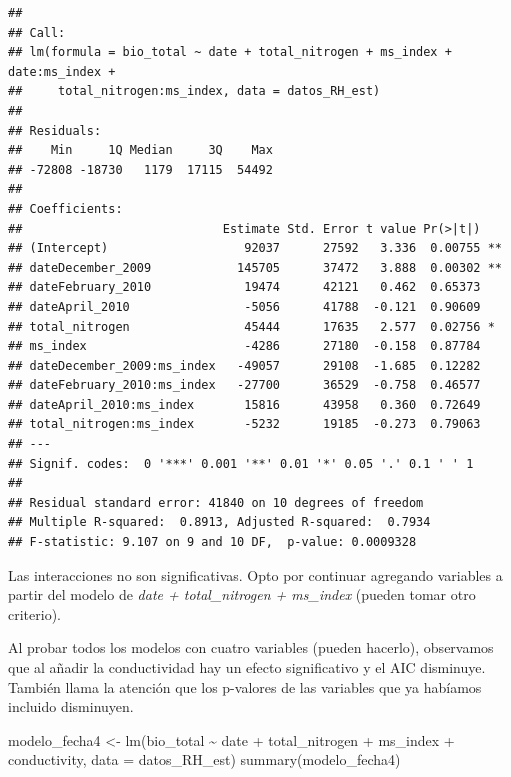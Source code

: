 \documentclass[
]{book}
\newenvironment{Shaded}{\begin{snugshade}}{\end{snugshade}}
\newcommand{\AttributeTok}[1]{\textcolor[rgb]{0.77,0.63,0.00}{#1}}
\newcommand{\FunctionTok}[1]{\textcolor[rgb]{0.00,0.00,0.00}{#1}}
\newcommand{\NormalTok}[1]{#1}
\newcommand{\OtherTok}[1]{\textcolor[rgb]{0.56,0.35,0.01}{#1}}
\newcommand{\SpecialCharTok}[1]{\textcolor[rgb]{0.00,0.00,0.00}{#1}}
\begin{document}
\begin{verbatim}
## 
## Call:
## lm(formula = bio_total ~ date + total_nitrogen + ms_index + date:ms_index + 
##     total_nitrogen:ms_index, data = datos_RH_est)
## 
## Residuals:
##    Min     1Q Median     3Q    Max 
## -72808 -18730   1179  17115  54492 
## 
## Coefficients:
##                            Estimate Std. Error t value Pr(>|t|)   
## (Intercept)                   92037      27592   3.336  0.00755 **
## dateDecember_2009            145705      37472   3.888  0.00302 **
## dateFebruary_2010             19474      42121   0.462  0.65373   
## dateApril_2010                -5056      41788  -0.121  0.90609   
## total_nitrogen                45444      17635   2.577  0.02756 * 
## ms_index                      -4286      27180  -0.158  0.87784   
## dateDecember_2009:ms_index   -49057      29108  -1.685  0.12282   
## dateFebruary_2010:ms_index   -27700      36529  -0.758  0.46577   
## dateApril_2010:ms_index       15816      43958   0.360  0.72649   
## total_nitrogen:ms_index       -5232      19185  -0.273  0.79063   
## ---
## Signif. codes:  0 '***' 0.001 '**' 0.01 '*' 0.05 '.' 0.1 ' ' 1
## 
## Residual standard error: 41840 on 10 degrees of freedom
## Multiple R-squared:  0.8913, Adjusted R-squared:  0.7934 
## F-statistic: 9.107 on 9 and 10 DF,  p-value: 0.0009328
\end{verbatim}

Las interacciones no son significativas. Opto por continuar agregando variables a partir del modelo de \emph{date + total\_nitrogen + ms\_index} (pueden tomar otro criterio).

Al probar todos los modelos con cuatro variables (pueden hacerlo), observamos que al añadir la conductividad hay un efecto significativo y el AIC disminuye. También llama la atención que los p-valores de las variables que ya habíamos incluido disminuyen.

\begin{Shaded}
\begin{Highlighting}[]
\NormalTok{modelo\_fecha4 }\OtherTok{\textless{}{-}} \FunctionTok{lm}\NormalTok{(bio\_total }\SpecialCharTok{\textasciitilde{}}\NormalTok{ date }\SpecialCharTok{+}\NormalTok{ total\_nitrogen }\SpecialCharTok{+}\NormalTok{ ms\_index }\SpecialCharTok{+}\NormalTok{ conductivity, }\AttributeTok{data =}\NormalTok{ datos\_RH\_est)}
\FunctionTok{summary}\NormalTok{(modelo\_fecha4)}
\end{Highlighting}
\end{Shaded}
\end{document}
